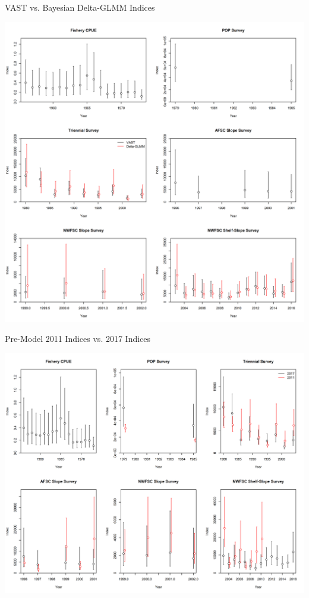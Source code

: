 \documentclass[pdf]{beamer}\usepackage[]{graphicx}\usepackage[]{color}
\begin{document}
\begin{frame}{VAST vs. Bayesian Delta-GLMM Indices}
  \begin{center}
    \includegraphics[scale = 0.30]{figures/Index_Comparison.png}
  \end{center}
\end{frame}  


\begin{frame}{Pre-Model 2011 Indices vs. 2017 Indices}
  \begin{center}
    \includegraphics[scale = 0.35]{figures/Index_Compare_2011_2017.png}
  \end{center}
\end{frame} 
\end{document}
